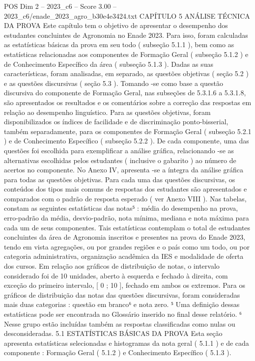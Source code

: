 \begin{textsample}{POS Dim 2 – 2023\_c6 – Score 3.00 – 2023\_c6/enade\_2023\_agro\_b30e4e3424.txt}  \label{ex:f2_pos_166}
CAPÍTULO 5 ANÁLISE TÉCNICA DA PROVA Este capítulo tem o objetivo de apresentar o desempenho dos estudantes concluintes de Agronomia no Enade 2023.
Para isso, foram calculadas as estatísticas básicas da prova em seu todo ( subseção 5.1.1 ), bem como as estatísticas relacionadas aos componentes de Formação Geral ( subseção 5.1.2 ) e de Conhecimento Específico da área ( subseção 5.1.3 ).
Dadas as suas características, foram analisadas, em separado, as questões objetivas ( seção 5.2 ) e as questões discursivas ( seção 5.3 ).
Tomando -se como base a questão discursiva do componente de Formação Geral, nas subseções de 5.3.1.6 a 5.3.1.8, são apresentados os resultados e os comentários sobre a correção das respostas em relação ao desempenho linguístico.
Para as questões objetivas, foram disponibilizados os índices de facilidade e de discriminação ponto-bisserial, também separadamente, para os componentes de Formação Geral ( subseção 5.2.1 ) e de Conhecimento Específico ( subseção 5.2.2 ).
De cada componente, uma das questões foi escolhida para exemplificar a análise gráfica, relacionando -se as alternativas escolhidas pelos estudantes ( inclusive o gabarito ) ao número de acertos no componente.
No Anexo IV, apresenta -se a íntegra da análise gráfica para todas as questões objetivas.
Para cada uma das questões discursivas, os conteúdos dos tipos mais comuns de respostas dos estudantes são apresentados e comparados com o padrão de resposta esperado ( ver Anexo VIII ).
Nas tabelas, constam as seguintes estatísticas das notas⁵ : média do desempenho na prova, erro-padrão da média, desvio-padrão, nota mínima, mediana e nota máxima para cada um de seus componentes.
Tais estatísticas contemplam o total de estudantes concluintes da área de Agronomia inscritos e presentes na prova do Enade 2023, tendo em vista agregações, ou por grandes regiões e o país como um todo, ou por categoria administrativa, organização acadêmica da IES e modalidade de oferta dos cursos.
Em relação aos gráficos de distribuição de notas, o intervalo considerado foi de 10 unidades, aberto à esquerda e fechado à direita, com exceção do primeiro intervalo, [ 0 ; 10 ], fechado em ambos os extremos.
Para os gráficos de distribuição das notas das questões discursivas, foram consideradas mais duas categorias : questão em branco⁶ e nota zero. ⁵ Uma definição dessas estatísticas pode ser encontrada no Glossário inserido no final desse relatório. ⁶ Nesse grupo estão incluídas também as respostas classificadas como nulas ou desconsideradas. 5.1 ESTATÍSTICAS BÁSICAS DA PROVA Esta seção apresenta estatísticas selecionadas e histogramas da nota geral ( 5.1.1 ) e de cada componente : Formação Geral ( 5.1.2 ) e Conhecimento Específico ( 5.1.3 ).

\end{textsample}
